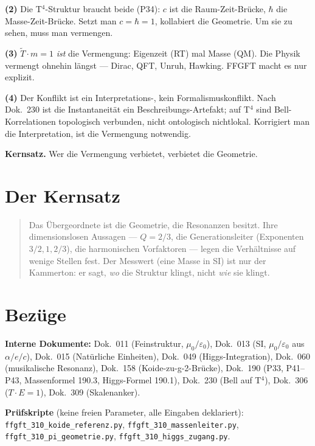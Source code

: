 \textbf{(2)} Die T$^4$-Struktur braucht beide (P34): $c$ ist die
Raum-Zeit-Brücke, $\hbar$ die Masse-Zeit-Brücke. Setzt man $c=\hbar=1$,
kollabiert die Geometrie. Um sie zu sehen, muss man vermengen.

\textbf{(3)} $\tilde T \cdot m = 1$ \emph{ist} die Vermengung: Eigenzeit
(RT) mal Masse (QM). Die Physik vermengt ohnehin längst — Dirac, QFT,
Unruh, Hawking. FFGFT macht es nur explizit.

\textbf{(4)} Der Konflikt ist ein Interpretations-, kein
Formalismuskonflikt. Nach Dok.~230 ist die Instantaneität ein
Beschreibungs-Artefakt; auf T$^4$ sind Bell-Korrelationen topologisch
verbunden, nicht ontologisch nichtlokal. Korrigiert man die
Interpretation, ist die Vermengung notwendig.

\medskip
\textbf{Kernsatz.} Wer die Vermengung verbietet, verbietet die
Geometrie.

\chapter{Der Kernsatz}

\begin{quote}
Das Übergeordnete ist die Geometrie, die Resonanzen besitzt. Ihre
dimensionslosen Aussagen — $Q = 2/3$, die Generationsleiter (Exponenten
$3/2, 1, 2/3$), die harmonischen Vorfaktoren — legen die
Verhältnisse auf wenige Stellen fest. Der Messwert (eine
Masse in SI) ist nur der Kammerton: er sagt, \emph{wo} die Struktur
klingt, nicht \emph{wie} sie klingt.
\end{quote}

\chapter{Bezüge}

\textbf{Interne Dokumente:} Dok.~011 (Feinstruktur, $\mu_0/\varepsilon_0$),
Dok.~013 (SI, $\mu_0/\varepsilon_0$ aus $\alpha/e/c$), Dok.~015
(Natürliche Einheiten), Dok.~049 (Higgs-Integration), Dok.~060
(musikalische Resonanz), Dok.~158 (Koide-zu-g-2-Brücke), Dok.~190
(P33, P41–P43, Massenformel 190.3, Higgs-Formel 190.1), Dok.~230
(Bell auf T$^4$), Dok.~306 ($T\cdot E = 1$), Dok.~309 (Skalenanker).

\medskip
\noindent\textbf{Prüfskripte} (keine freien Parameter, alle Eingaben
deklariert): \texttt{ffgft\_310\_koide\_referenz.py},
\texttt{ffgft\_310\_massenleiter.py},
\texttt{ffgft\_310\_pi\_geometrie.py},
\texttt{ffgft\_310\_higgs\_zugang.py}.
